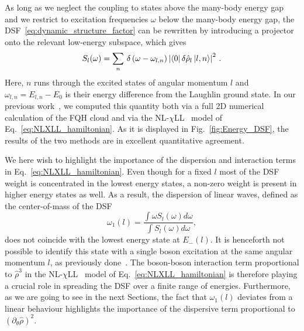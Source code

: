 \documentclass[twocolumn,pra,superscriptaddress,noshowpacs]{revtex4}
\newcommand{\nlchill}{NL-$\chi$LL }
\begin{document}
As long as we neglect the coupling to states above the many-body energy gap and we restrict to excitation frequencies $\omega$ below the many-body energy gap, the DSF~\eqref{eq:dynamic_structure_factor} can be rewritten by introducing a projector onto the relevant low-energy subspace, which gives
\begin{equation}
    \label{eq_laughlin_projected_DSF}
    S_l(\omega)=\sum_n\,\delta\left(\omega-\omega_{l,n}\right) \left|\bra{0}
    \delta\hat{\rho}_l \ket{l,n}\right|^2\,.
\end{equation}
Here, $n$ runs through the excited states of angular momentum $l$ and $\omega_{l,n}=E_{l,n}-E_0$ is their energy difference from the Laughlin ground state.
In our previous work~\cite{Nardin_PRA_2023}, we computed this quantity both via a full 2D numerical calculation of the FQH cloud and via the \nlchill~model of Eq.~\eqref{eq:NLXLL_hamiltonian}. As it is displayed in Fig.~\ref{fig:Energy_DSF}, the results of the two methods are in excellent quantitative agreement. 

We here wish to highlight the importance of the dispersion and interaction terms in Eq.~\eqref{eq:NLXLL_hamiltonian}.
Even though for a fixed $l$ most of the DSF weight is concentrated in the lowest energy states, a non-zero weight is present in higher energy states as well. As a result, the dispersion of linear waves, defined as the center-of-mass of the DSF
\begin{equation}
    \label{eq:DSFFirstMoment}
     \omega_1(l)=\frac{\int \omega S_l(\omega) d\omega}{\int S_l(\omega) d\omega},
 \end{equation}
does not coincide with the lowest energy state at $E_{-}(l)$.
It is henceforth not possible to identify this state with a single boson excitation at the same angular momentum $l$, as previously done~\cite{Stone_PRB_1992,Wan_PRB_2003,Wan_PRB_2008,Jolad_PRL_2009,Jolad_PRB_2010}.
The boson-boson interaction term proportional to $\hat\rho^3$  in the \nlchill~model of Eq.~\eqref{eq:NLXLL_hamiltonian} is therefore playing a crucial role in spreading the DSF over a finite range of energies.
Furthermore, as we are going to see in the next Sections, the fact that $\omega_1(l)$ deviates from a linear behaviour
highlights the importance of the dispersive term proportional to $(\partial_\theta \hat\rho)^2$.
\end{document}
